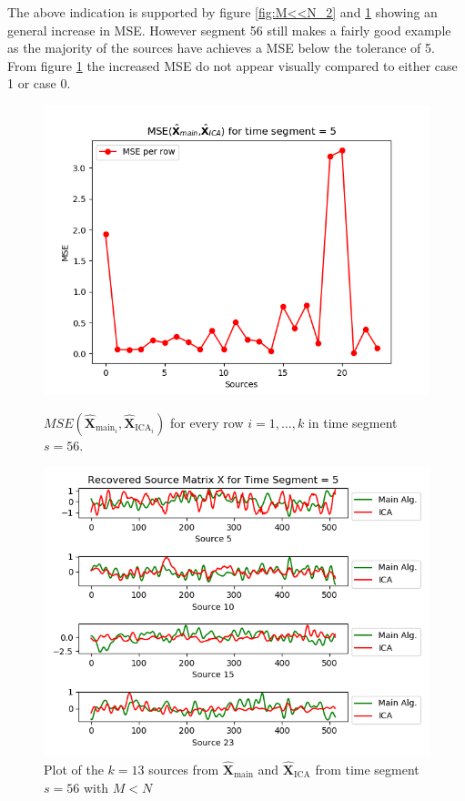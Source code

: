 \noindent 
The above indication is supported by figure \ref{fig:M<<N_2} and \ref{fig:M<<N_3} showing an general increase in MSE. However segment 56 still makes a fairly good example as the majority of the sources have achieves a MSE below the tolerance of 5. From figure \ref{fig:M<<N_3} the increased MSE do not appear visually compared to either case 1 or case 0.        
\begin{figure}[H]
\begin{widepage}
    \begin{minipage}[t]{.49\textwidth}
\centering
\includegraphics[width=1\linewidth]{figures/ch_7/resultat/mse_second_removed_ica_timeseg5.png}
\caption{$MSE\left(\hat{\mathbf{X}}_{\text{main}_{i}},\hat{\mathbf{X}}_{\text{ICA}_{i}}\right)$ for every row $i = 1, \hdots, k$ in time segment $s=56$.}
\label{fig:M<<N_2}
\end{minipage} 
\hspace{.5cm}
\begin{minipage}[t]{.49\textwidth}
\centering
\includegraphics[width=1\linewidth]{figures/ch_7/resultat/EEG_second_removed_scaled_timeseg5S1_CClean.png}
\caption{Plot of the $k = 13$ sources from $\hat{\mathbf{X}}_{\text{main}}$ and $\hat{\mathbf{X}}_{\text{ICA}}$ from time segment $s = 56$ with $M<N$}
	\label{fig:M<<N_3}
    \end{minipage}
\end{widepage}
\end{figure}
